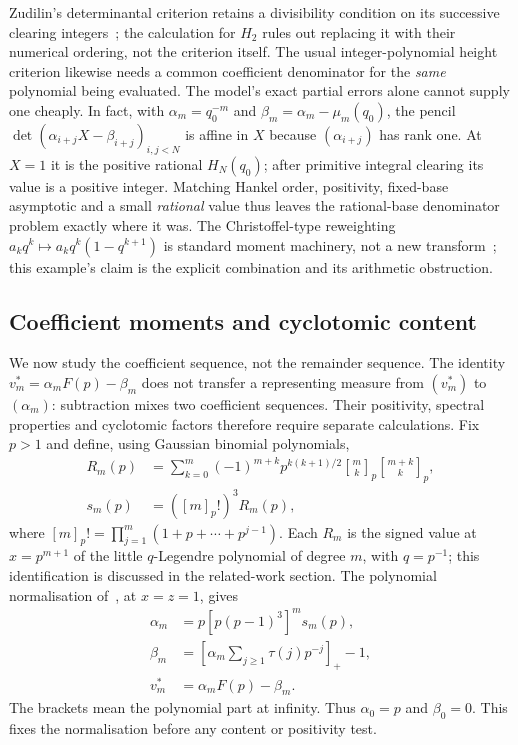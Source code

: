 Zudilin's determinantal criterion retains a divisibility condition on
its successive clearing integers~\cite[Props.~1--2]{zudilin2017detv2};
the calculation for $H_2$ rules out replacing it with their numerical
ordering, not the criterion itself.  The usual integer-polynomial
height criterion likewise needs a common coefficient denominator for the
\emph{same} polynomial being evaluated.  The model's exact partial
errors alone cannot supply one cheaply.  In fact, with
$\alpha_m=q_0^{-m}$ and $\beta_m=\alpha_m-\mu_m(q_0)$, the pencil
$\det(\alpha_{i+j}X-\beta_{i+j})_{i,j<N}$ is affine in $X$ because
$(\alpha_{i+j})$ has rank one.  At $X=1$ it is the positive rational
$H_N(q_0)$; after primitive integral clearing its value is a positive
integer.  Matching Hankel order, positivity, fixed-base asymptotic and
a small \emph{rational} value thus leaves the rational-base denominator
problem exactly where it was.  The Christoffel-type reweighting
$a_kq^k\mapsto a_kq^k(1-q^{k+1})$ is standard moment machinery, not a
new transform~\cite[Intro., (3)--(4)]{kozhanvaktnas2024}; this example's claim is
the explicit combination and its arithmetic obstruction.

\subsection{Coefficient moments and cyclotomic content}
\label{long1049:sec:coefficient-questions}
We now study the coefficient sequence, not the remainder sequence.
The identity $v_m^*=\alpha_mF(p)-\beta_m$ does not transfer a
representing measure from $(v_m^*)$ to $(\alpha_m)$: subtraction
mixes two coefficient sequences. Their positivity, spectral
properties and cyclotomic factors therefore require separate
calculations. Fix $p>1$ and define, using Gaussian binomial
polynomials,
\[
 \begin{aligned}
 R_m(p)&=\sum_{k=0}^m(-1)^{m+k}p^{k(k+1)/2}
          \genfrac{[}{]}{0pt}{}{m}{k}_p\genfrac{[}{]}{0pt}{}{m+k}{k}_p,\\
 s_m(p)&=([m]_p!)^3R_m(p),
 \end{aligned}
\]
where $[m]_p!=\prod_{j=1}^m(1+p+\cdots+p^{j-1})$.
Each $R_m$ is the signed value at $x=p^{m+1}$ of the little
$q$-Legendre polynomial of degree $m$, with $q=p^{-1}$; this
identification is discussed in the related-work section.
The polynomial normalisation of~\cite[Sec.~3, p.~5]{zudilin2016}, at
$x=z=1$, gives
\[
 \begin{aligned}
 \alpha_m&=p[p(p-1)^3]^m s_m(p),\\
 \beta_m&=\left[\alpha_m\sum_{j\ge1}\tau(j)p^{-j}\right]_+-1,\\
 v_m^*&=\alpha_mF(p)-\beta_m.
 \end{aligned}
\]
The brackets mean the polynomial part at infinity. Thus
$\alpha_0=p$ and $\beta_0=0$. This fixes the normalisation before any
content or positivity test.

